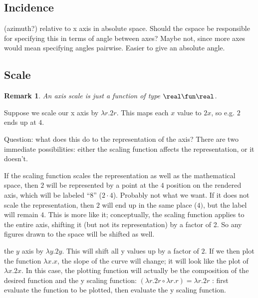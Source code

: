 \documentclass[12pt]{tufte-handout}
\numberwithin{equation}{subsection}
\numberwithin{equation}{subsection}
\newtheorem{remark}{Remark}
\begin{document}
  \subsection{Incidence}
  \label{subs:incidence}

  (azimuth?) relative to x axis in absolute space.
  Should the cspace be responsible for specifying this in terms of
  angle between axes?  Maybe not, since more axes would mean
  specifying angles pairwise.  Easier to give an absolute angle.

  \subsection{Scale}
  \label{subs:axisscale}

  \begin{remark}
    An axis scale is just a function of type \(\real\fun\real\).
  \end{remark}

  Suppose we scale our x axis by \(\lambda r.2r\).  This maps each \(x\)
  value to \(2x\), so e.g. \(2\) ends up at \(4\).

  Question: what does this do to the representation of the axis?  There
  are two immediate possibilities: either the scaling function affects
  the representation, or it doesn't.

  If the scaling function scales the representation as well as the
  mathematical space, then \(2\) will be represented by a point at the \(4\)
  position on the rendered axis, which will be labeled ``8'' (\(2\cdot
  4\)).  Probably not what we want.  If it does not scale the
  representation, then \(2\) will end up in the same place (\(4)\), but
  the label will remain \(4\).  This is more like it; conceptually, the
  scaling function applies to the entire axis, shifting it (but not its
  representation) by a factor of 2.  So any figures drawn to the space
  will be shifted as well.

   the \(y\) axis by \(\lambda y.2y\).
  This will shift all y values up by a factor of \(2\).  If we then plot
  the function \(\lambda x.x\), the slope of the curve will change; it
  will look like the plot of \(\lambda x.2x\).  In this case, the
  plotting function will actually be the composition of the desired
  function and the y scaling function: \((\lambda r.2r\circ\lambda r.r)
  = \lambda r.2r\)%
  : first evaluate the function to be plotted, then
  evaluate the y scaling function.
\end{document}
